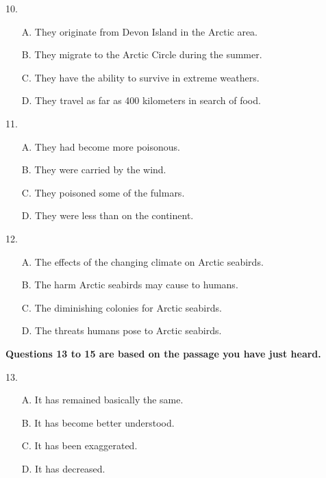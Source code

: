 \documentclass[UTF8,11pt]{ctexart}
\begin{document}
10.


\begin{itemize}[leftmargin=2em,itemsep=.2em,topsep=.4em]\item[A.] They originate from Devon Island in the Arctic area.
\item[B.] They migrate to the Arctic Circle during the summer.
\item[C.] They have the ability to survive in extreme weathers.
\item[D.] They travel as far as 400 kilometers in search of food.
\end{itemize}

11.


\begin{itemize}[leftmargin=2em,itemsep=.2em,topsep=.4em]\item[A.] They had become more poisonous.
\item[B.] They were carried by the wind.
\item[C.] They poisoned some of the fulmars.
\item[D.] They were less than on the continent.
\end{itemize}

12.


\begin{itemize}[leftmargin=2em,itemsep=.2em,topsep=.4em]\item[A.] The effects of the changing climate on Arctic seabirds.
\item[B.] The harm Arctic seabirds may cause to humans.
\item[C.] The diminishing colonies for Arctic seabirds.
\item[D.] The threats humans pose to Arctic seabirds.
\end{itemize}

\textbf{Questions 13 to 15 are based on the passage you have just heard.}


13.


\begin{itemize}[leftmargin=2em,itemsep=.2em,topsep=.4em]\item[A.] It has remained basically the same.
\item[B.] It has become better understood.
\item[C.] It has been exaggerated.
\end{itemize}

\begin{itemize}[leftmargin=2em,itemsep=.2em,topsep=.4em]\item[D.] It has decreased.
\end{itemize}
\end{document}

